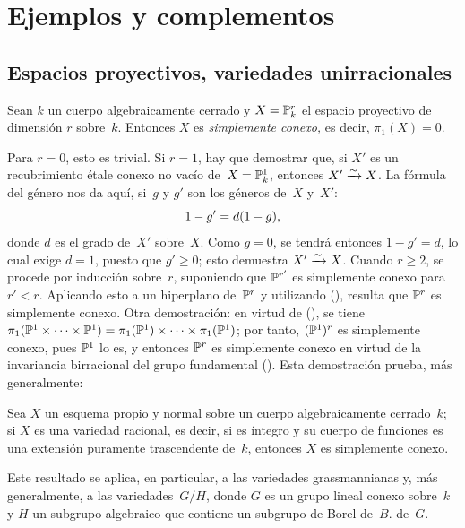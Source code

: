 \chapter{Ejemplos y complementos}
\label{XI}

\section{Espacios proyectivos, variedades unirracionales}
\label{XI.1}

\begin{proposition}
\label{XI.1.1}
Sean $k$ un cuerpo algebraicamente cerrado y $X=\mathbb P_k^r$ el espacio
proyectivo de dimensión $r$ sobre~$k$. Entonces $X$ es \emph{simplemente
conexo,} es decir, $\pi_1(X)=0$.
\end{proposition}

Para $r=0$, esto es trivial. Si $r=1$, hay que demostrar que, si $X'$ es
un recubrimiento étale conexo no vacío de~$X=\mathbb P_k^1$, entonces
$X'\xrightarrow{\sim} X$. La fórmula del género nos da aquí, si~$g$ y $g'$ son
los géneros de~$X$ y~$X'$:
$$
1-g' = d(1-g),
$$
donde $d$ es el grado de~$X'$ sobre~$X$. Como $g=0$, se tendrá entonces
$1-g'=d$, lo cual exige $d=1$, puesto que $g'\ge 0$; esto demuestra
$X'\xrightarrow{\sim} X$. Cuando $r\ge 2$, se procede por inducción
sobre~$r$, suponiendo que $\mathbb P^{r'}$ es simplemente conexo para
$r'<r$. Aplicando esto a un hiperplano de~$\mathbb P^r$ y utilizando
(), resulta que $\mathbb P^r$ es simplemente conexo. Otra
demostración: en virtud de (), se tiene
$\pi_1(\mathbb P^1\times\cdots\times \mathbb P^1) = \pi_1(\mathbb P^1)\times\cdots
\times \pi_1(\mathbb P^1)$; por tanto, $(\mathbb P^1)^r$ es simplemente conexo,
pues $\mathbb P^1$ lo es, y entonces $\mathbb P^r$ es simplemente conexo en virtud
de la invariancia birracional del grupo fundamental (). Esta
demostración prueba, más generalmente:

\begin{corollaire}
\label{XI.1.2}
Sea $X$ un esquema propio y normal sobre un cuerpo algebraicamente
cerrado~$k$; si $X$ es una variedad racional, es decir, si es íntegro y
su cuerpo de funciones es una extensión puramente trascendente de~$k$,
entonces $X$ es simplemente conexo.
\end{corollaire}

Este resultado se aplica, en particular, a las variedades grassmannianas y,
más
%
generalmente, a las variedades~$G/H$, donde $G$ es un grupo lineal conexo
sobre~$k$ y $H$ un subgrupo algebraico que contiene un subgrupo de Borel
{de~$B$.}
{de~$G$.}

